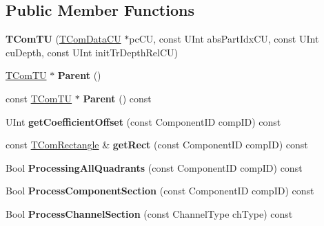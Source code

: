 \subsection*{Public Member Functions}
\begin{DoxyCompactItemize}
\item 
\mbox{\label{class_t_com_t_u_af8bcd1dc2692ff94d55dcafef482bb6c}} 
{\bfseries T\+Com\+TU} (\hyperlink{class_t_com_data_c_u}{T\+Com\+Data\+CU} $\ast$pc\+CU, const U\+Int abs\+Part\+Idx\+CU, const U\+Int cu\+Depth, const U\+Int init\+Tr\+Depth\+Rel\+CU)
\item 
\mbox{\label{class_t_com_t_u_a3c4408c6887b074568905735a63842a3}} 
\hyperlink{class_t_com_t_u}{T\+Com\+TU} $\ast$ {\bfseries Parent} ()
\item 
\mbox{\label{class_t_com_t_u_a6897276492e40c8ed66728ec769ca110}} 
const \hyperlink{class_t_com_t_u}{T\+Com\+TU} $\ast$ {\bfseries Parent} () const
\item 
\mbox{\label{class_t_com_t_u_aaa057a81fb1c3fa3007e63b50c4be142}} 
U\+Int {\bfseries get\+Coefficient\+Offset} (const Component\+ID comp\+ID) const
\item 
\mbox{\label{class_t_com_t_u_a17c5a3b40b297659189af49bf2aa5b3c}} 
const \hyperlink{struct_t_com_rectangle}{T\+Com\+Rectangle} \& {\bfseries get\+Rect} (const Component\+ID comp\+ID) const
\item 
\mbox{\label{class_t_com_t_u_a6d04f5290075cb879562c73f603631d6}} 
Bool {\bfseries Processing\+All\+Quadrants} (const Component\+ID comp\+ID) const
\item 
\mbox{\label{class_t_com_t_u_ae93dc3d8b872abe174a610d64845ecb1}} 
Bool {\bfseries Process\+Component\+Section} (const Component\+ID comp\+ID) const
\item 
\mbox{\label{class_t_com_t_u_a63f031a5cf190bbd7c7ef5bf6681ebef}} 
Bool {\bfseries Process\+Channel\+Section} (const Channel\+Type ch\+Type) const
\item 
\mbox{\label{class_t_com_t_u_ae33d8a9122f887430d6396438c075c60}} 

\end{DoxyCompactItemize}
